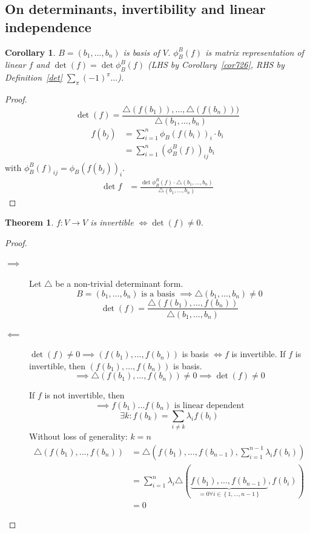 \documentclass{article}
\newtheorem{theorem}{Theorem}  \numberwithin{theorem}{section}
\newtheorem{corollary}{Corollary}  \numberwithin{corollary}{section}
\newcommand{\set}[1]{\left\{#1\right\}}
\begin{document}
\subsection{On determinants, invertibility and linear independence}

\begin{corollary} %
  \label{cor:feqphif}
  $B = (b_1, \dots, b_n)$ is basis of $V$.
  $\phi_B^B(f)$ is matrix representation of linear $f$ and $\det(f) = \det\phi_B^B(f)$
  (LHS by Corollary~\ref{cor726}, RHS by Definition~\ref{det} $\sum_{\pi} (-1)^\pi \dots$).
\end{corollary}

\begin{proof}
  \[ \det(f) = \frac{\triangle(f(b_1)), \dots, \triangle(f(b_n)))}{\triangle (b_1, \dots, b_n)} \]
  \begin{align*}
    f(b_j) &= \sum_{i=1}^n \phi_B(f(b_i))_i \cdot b_i \\
         &= \sum_{i=1}^n \left(\phi_B^B(f)\right)_{ij} b_i
  \end{align*}
  with $\phi_B^B(f)_{ij} = \phi_B(f(b_j))_i$.
  \begin{align*}
    \det{f} &= \frac{\det{\phi_B^B(f) \cdot \triangle(b_1, \dots, b_n)}}{\triangle(b_1, \dots, b_n)}
  \end{align*}
\end{proof}

\begin{theorem} %
  $f: V \to V$ is invertible $\iff \det(f) \neq 0$.
\end{theorem}
\begin{proof}
  \begin{description}
    \item[$\implies$] 
      Let $\triangle$ be a non-trivial determinant form.
      \[ B = (b_1, \dots, b_n) \text{ is a basis } \implies \triangle(b_1, \dots, b_n) \neq 0 \]
      \[ \det(f) = \frac{\triangle(f(b_1), \dots, f(b_n))}{\triangle(b_1, \dots, b_n)} \]
    \item[$\impliedby$]
      $\det(f) \neq 0 \implies (f(b_1), \dots, f(b_n))$ is basis $\iff f$ is invertible.
      If $f$ is invertible, then $(f(b_1), \dots, f(b_n))$ is basis.
      \[ \implies \triangle (f(b_1), \dots, f(b_n)) \neq 0 \implies \det(f) \neq 0 \]

      If $f$ is not invertible, then
      \[ \implies f(b_1) \dots f(b_n) \text{ is linear dependent} \]
      \[ \exists k: f(b_k) = \sum_{i\neq k} \lambda_i f(b_i) \]
      Without loss of generality: $k = n$
      \begin{align*}
        \triangle(f(b_1), \dots, f(b_n)) &= \triangle(f(b_1), \dots, f(b_{n-1}), \sum_{i=1}^{n-1} \lambda_i f(b_i)) \\
          &= \sum_{i=1}^n \lambda_i \triangle(\underbrace{f(b_1), \dots, f(b_{n-1})}_{=0 \forall i \in \set{1,\dots,n-1}}, f(b_i)) \\
          &= 0
      \end{align*}
  \end{description}
\end{proof}
\end{document}
